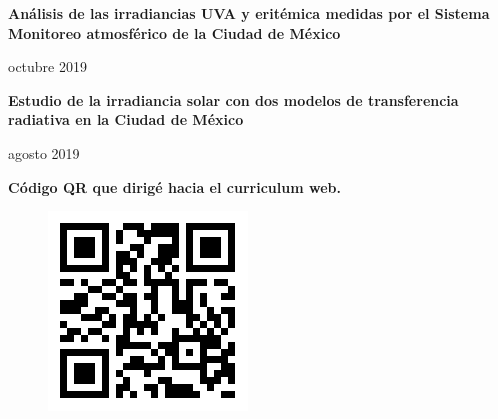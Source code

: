 \documentclass[a3paper]{report}
\newenvironment{proyects}[2]{\begin{minipage}{0.79\linewidth}\textbf{#1}
\end{minipage}\begin{minipage}{0.2\linewidth}
    \begin{flushright}
      #2
}{\end{flushright}
  \end{minipage}}
\begin{document}
\begin{multicols}{2}
  \vspace{0.7cm}

  \begin{proyects}{Análisis de las irradiancias UVA y eritémica medidas por el Sistema Monitoreo atmosférico de la Ciudad de México}{octubre 2019}
  \end{proyects}

  \vspace{0.7cm}

  \begin{proyects}{Estudio de la irradiancia solar con dos modelos de transferencia radiativa en la Ciudad de México}{agosto 2019}
  \end{proyects}

  \begin{flushright}
    \begin{minipage}{0.5\linewidth}
      \begin{flushright}
        \changefontsizes{20pt}
        \textbf{Código QR que dirigé hacia el curriculum web.}
      \end{flushright}
    \end{minipage}
    \begin{minipage}{0.4\linewidth}
      \begin{figure}[H]
        \includegraphics[scale=0.75]{qr.png}
      \end{figure}
    \end{minipage}
  \end{flushright}
\end{multicols}
\end{document}
